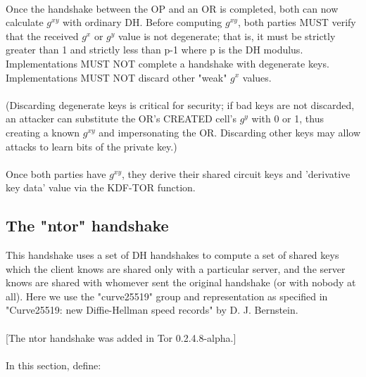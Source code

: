 \paragraph{}
Once the handshake between the OP and an OR is completed, both can
now calculate $g^{xy}$ with ordinary DH. Before computing $g^{xy}$, both parties
MUST verify that the received $g^x$ or $g^y$ value is not degenerate;
that is, it must be strictly greater than 1 and strictly less than p-1
where p is the DH modulus. Implementations MUST NOT complete a handshake
with degenerate keys. Implementations MUST NOT discard other "weak"
$g^x$ values.

\paragraph{}
(Discarding degenerate keys is critical for security; if bad keys
are not discarded, an attacker can substitute the OR's CREATED
cell's $g^y$ with 0 or 1, thus creating a known $g^{xy}$ and impersonating
the OR. Discarding other keys may allow attacks to learn bits of
the private key.)

\paragraph{}
Once both parties have $g^{xy}$, they derive their shared circuit keys
and 'derivative key data' value via the KDF-TOR function.

\subsection{The "ntor" handshake}
This handshake uses a set of DH handshakes to compute a set of
shared keys which the client knows are shared only with a particular
server, and the server knows are shared with whomever sent the
original handshake (or with nobody at all). Here we use the
"curve25519" group and representation as specified in "Curve25519:
new Diffie-Hellman speed records" by D. J. Bernstein.

\paragraph{}
[The ntor handshake was added in Tor 0.2.4.8-alpha.]

\paragraph{}
In this section, define:

